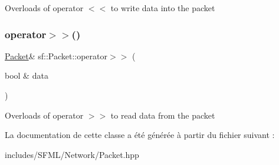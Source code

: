Overloads of operator $<$$<$ to write data into the packet \mbox{\label{classsf_1_1Packet_af8e26c63ba9bdccd262565ff0d3eeba2}} 
\subsubsection{\texorpdfstring{operator$>$$>$()}{operator>>()}}
{\footnotesize\ttfamily \hyperlink{classsf_1_1Packet}{Packet}\& sf\+::\+Packet\+::operator$>$$>$ (\begin{DoxyParamCaption}\item[{bool \&}]{data }\end{DoxyParamCaption})}

Overloads of operator $>$$>$ to read data from the packet 

La documentation de cette classe a été générée à partir du fichier suivant \+:\begin{DoxyCompactItemize}
\item 
includes/\+S\+F\+M\+L/\+Network/Packet.\+hpp\end{DoxyCompactItemize}
